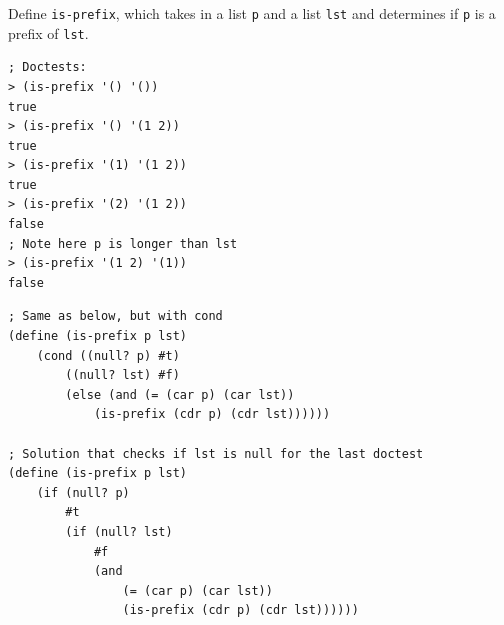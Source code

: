 \documentclass{exam}
\begin{document}
\begin{questions}
\begin{blocksection}
\question Define \texttt{is-prefix}, which takes in a list \texttt{p} and a list \texttt{lst} and determines if \texttt{p} is a prefix of \texttt{lst}.

\begin{lstlisting}
; Doctests:
> (is-prefix '() '())
true
> (is-prefix '() '(1 2))
true
> (is-prefix '(1) '(1 2))
true
> (is-prefix '(2) '(1 2))
false
; Note here p is longer than lst
> (is-prefix '(1 2) '(1))
false
\end{lstlisting}

\begin{solution}[0.5in]
\begin{lstlisting}
; Same as below, but with cond
(define (is-prefix p lst)
    (cond ((null? p) #t)
        ((null? lst) #f)
        (else (and (= (car p) (car lst))
            (is-prefix (cdr p) (cdr lst))))))

; Solution that checks if lst is null for the last doctest
(define (is-prefix p lst)
    (if (null? p)
        #t
        (if (null? lst)
            #f
            (and
                (= (car p) (car lst))
                (is-prefix (cdr p) (cdr lst))))))
\end{lstlisting}
\end{solution}
\end{blocksection}

\end{questions}

\end{document}
